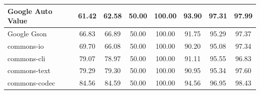 \documentclass[conference,draftclsnofoot,onecolumn]{IEEEtran}
\begin{document}
\begin{table}[ht]
\begin{tabular}{|l|c|c|c|c|c|c|c|}
Google Auto Value             & 61.42                                                  & 62.58                                                       & 50.00    & 100.00   & 93.90                                                          & 97.31                                                                             & 97.99                                                                             \\ \hline
Google Gson                   & 66.83                                                  & 66.89                                                       & 50.00    & 100.00   & 91.75                                                          & 95.29                                                                             & 97.37                                                                             \\ \hline
commons-io                    & 69.70                                                  & 66.08                                                       & 50.00    & 100.00   & 90.20                                                          & 95.08                                                                             & 97.34                                                                             \\ \hline
commons-cli                   & 79.07                                                  & 78.97                                                       & 50.00    & 100.00   & 91.11                                                          & 95.55                                                                             & 96.83                                                                             \\ \hline
commons-text                  & 79.29                                                  & 79.30                                                       & 50.00    & 100.00   & 90.95                                                          & 95.34                                                                             & 97.60                                                                             \\ \hline
commons-codec                 & 84.56                                                  & 84.59                                                       & 50.00    & 100.00   & 94.56                                                          & 96.95                                                                             & 98.43                                                                             \\ \hline

\end{tabular}
\end{table}
\end{document}
